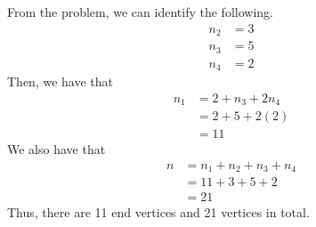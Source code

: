\begin{parts}
      \begin{solution}
        From the problem, we can identify the following. 
        \[
          \begin{aligned}
            n_2 &= 3 \\ 
            n_3 &= 5 \\ 
            n_4 &= 2
          \end{aligned}
        \]
        Then, we have that 
        \[
          \begin{aligned}
            n_1 &= 2 + n_3 + 2n_4 \\ 
                &= 2 + 5 + 2(2) \\ 
                &= 11
          \end{aligned}
        \]
        We also have that
        \[
          \begin{aligned}
            n &= n_1 + n_2 + n_3 + n_4 \\ 
              &= 11 + 3 + 5 + 2 \\ 
              &= 21
          \end{aligned}
        \]
        Thus, there are 11 end vertices and 21 vertices in total. 
      \end{solution}
  \end{parts}
